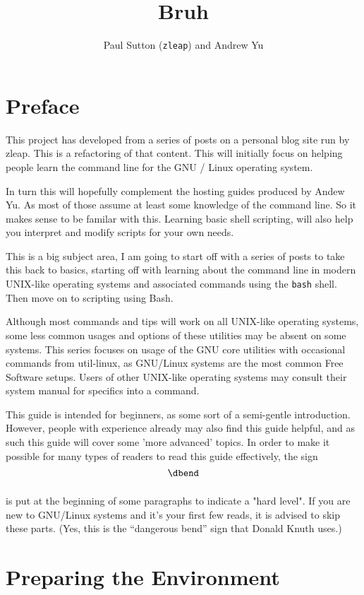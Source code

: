 \documentclass{extbook}
\title{Bruh}
\author{Paul Sutton (\texttt{zleap}) and Andrew Yu}
\begin{document}
\maketitle

\frontmatter
\chapter{Preface}

This project has developed from a series of posts on a personal blog site run by zleap. This is a refactoring of that content.  This will initially focus on helping people learn the command line for the GNU / Linux operating system.

In turn this will hopefully complement the hosting guides produced by Andew Yu.  As most of those assume at least some knowledge of the command line.  So it makes sense to be familar with this.  Learning basic shell scripting, will also help you interpret and modify scripts for your own needs. 

This is a big subject area, I am going to start off with a series of posts to take this back to basics, starting off with learning about the command line in modern UNIX-like operating systems and associated commands using the \texttt{bash} shell.  Then move on to scripting using Bash. 

Although most commands and tips will work on all UNIX-like operating systems, some less common usages and options of these utilities may be absent on some systems.  This series focuses on usage of the GNU core utilities with occasional commands from util-linux, as GNU/Linux systems are the most common Free Software setups.  Users of other UNIX-like operating systems may consult their system manual for specifics into a command.

This guide is intended for beginners, as some sort of a semi-gentle introduction.  However, people with experience already may also find this guide helpful, and as such this guide will cover some 'more advanced' topics.  In order to make it possible for many types of readers to read this guide effectively, the  sign
$$\vbox{\hbox{\dbend}\vskip 11pt}$$
is put at the beginning of some paragraphs to indicate a "hard level".  If you are new to GNU/Linux systems and it's your first few reads, it is advised to skip these parts.  (Yes, this is the ``{dangerous bend}'' sign that Donald Knuth uses.)

\tableofcontents

\mainmatter
\chapter{Preparing the Environment}
\end{document}
